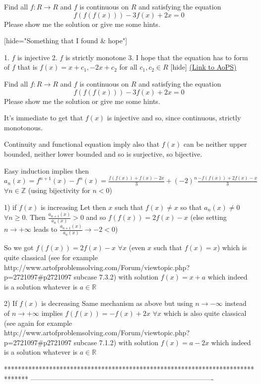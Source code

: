 \begin{problem}
	Find all $f:R\rightarrow R$ and $f$ is continuous on $R$ and satisfying the equation
\[f(f(f(x)))-3f(x)+2x=0\]
Please show me the solution or give me some hints.

[hide="Something that I found & hope"]

1. $f$ is injective
2. $f$ is strictly monotone
3. I hope that the equation has to form of $f$ that is $f(x)=x+c_1,-2x+c_2$  for all $c_1,c_2\in R$
[\/hide]
	\flushright \href{https://artofproblemsolving.com/community/c6h606182}{(Link to AoPS)}
\end{problem}



\begin{solution}
	\begin{tcolorbox}Find all $f:R\rightarrow R$ and $f$ is continuous on $R$ and satisfying the equation
\[f(f(f(x)))-3f(x)+2x=0\]
Please show me the solution or give me some hints.
\end{tcolorbox}
It's immediate to get that $f(x)$ is injective and so, since continuous, strictly monotonous.

Continuity and functional equation imply also that $f(x)$ can be neither upper bounded, neither lower bounded and so is surjective, so bijective.

Easy induction implies then $a_n(x)=f^{n+1}(x)-f^{n}(x)=\frac{f(f(x))+f(x)-2x}3+(-2)^n\frac{-f(f(x))+2f(x)-x}3$ $\forall n\in\mathbb Z$ (using bijectivity for $n<0$)

1) if $f(x)$ is increasing
Let then $x$ such that $f(x)\ne x$ so that $a_n(x)\ne 0$ $\forall n\ge 0$. Then $\frac{a_{n+1}(x)}{a_n(x)}>0$ and so $f(f(x))=2f(x)-x$ (else setting $n\to +\infty$ leads to $\frac{a_{n+1}(x)}{a_n(x)}\to -2<0$)

So we got $f(f(x))=2f(x)-x$ $\forall x$ (even $x$ such that $f(x)=x$) which is quite classical (see for example http://www.artofproblemsolving.com/Forum/viewtopic.php?p=2721097#p2721097 subcase 7.3.2) with solution $\boxed{f(x)=x+a}$ which indeed is a solution whatever is $a\in\mathbb R$

2) If $f(x)$ is decreasing
Same mechanism as above but using $n\to -\infty$ instead of $n\to +\infty$ implies $f(f(x))=-f(x)+2x$ $\forall x$ which is also quite classical (see again for example http://www.artofproblemsolving.com/Forum/viewtopic.php?p=2721097#p2721097 subcase 7.1.2) with solution $\boxed{f(x)=a-2x}$ which indeed is a solution whatever is $a\in\mathbb R$
\end{solution}
*******************************************************************************
-------------------------------------------------------------------------------

